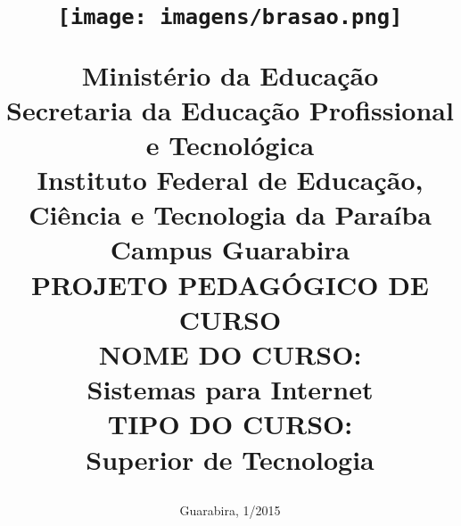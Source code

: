 \documentclass[12pt]{article}
\begin{document}
\title{  \vspace{-0.8in} 
\begin{figure}[!htb]
\centering
\texttt{[image: imagens/brasao.png]}
\end{figure}
 \Large  Minist\'erio da Educa\c{c}\~ao  \\
 Secretaria da Educa\c{c}\~ao Profissional e Tecnol\'ogica   \\
Instituto Federal de Educa\c{c}\~ao, Ci\^encia e Tecnologia da Para\'iba \\
Campus Guarabira\\
\vspace{3cm}
\bf \large PROJETO PEDAG\'OGICO DE CURSO\\
\vspace{2cm}
\normalsize NOME DO CURSO:\\
\large Sistemas para Internet\\
\vspace{2cm}
\normalsize TIPO DO CURSO:\\
\large Superior de Tecnologia}


 \vspace{2cm}
\large
\date{\vspace{3.6cm}Guarabira, 1/2015}
\maketitle
\normalsize
\thispagestyle{empty}

\tableofcontents




\end{document}
